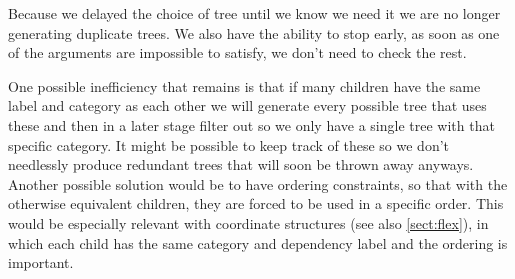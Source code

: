 Because we delayed the choice of tree until we know we need it we are no longer generating duplicate trees.
We also have the ability to stop early, as soon as one of the arguments are impossible to satisfy, we don't need to check the rest.

One possible inefficiency that remains is that if many children have the same label and category as each other we will
generate every possible tree that uses these and then in a later stage filter out so we only have a single tree with that specific category. It might be possible to keep track of these so we don't needlessly produce redundant trees that will soon be thrown away anyways. 
Another possible solution would be to have ordering constraints, so that with the otherwise equivalent children, they are forced to be used in a specific order. This would be especially relevant with coordinate structures (see also \autoref{sect:flex}), in which each child has the same category and dependency label and the ordering is important.




